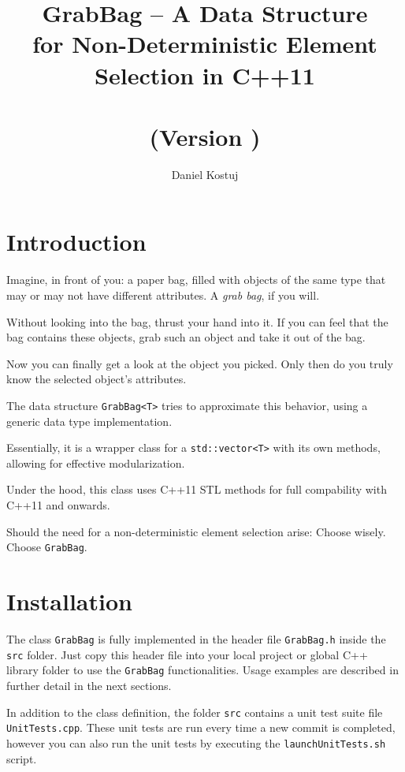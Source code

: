 \documentclass[a4paper,12pt]{article}
\title{GrabBag -- A Data Structure \\ for Non-Deterministic Element Selection in C++11 \\~\\ \normalsize(Version \packageversion)}
\author{Daniel Kostuj}
\begin{document}
\begin{titlingpage}
\maketitle 
\end{titlingpage}

\newpage

\section{Introduction}

Imagine, in front of you: a paper bag, filled with objects of the same type that may or may not have different attributes. 
A \emph{grab bag}, if you will. 

Without looking into the bag, thrust your hand into it.
If you can feel that the bag contains these objects, grab such an object and take it out of the bag.

Now you can finally get a look at the object you picked.
Only then do you truly know the selected object's attributes.

The data structure \texttt{GrabBag<T>} tries to approximate this behavior, using a generic data type implementation.

Essentially, it is a wrapper class for a \texttt{std::vector<T>} with its own methods, allowing for effective modularization.

Under the hood, this class uses C++11 STL methods for full compability with C++11 and onwards.

Should the need for a non-deterministic element selection arise: Choose wisely. Choose \texttt{GrabBag}.

\section{Installation}

The class \texttt{GrabBag} is fully implemented in the header file \texttt{GrabBag.h} inside the \texttt{src} folder. 
Just copy this header file into your local project or global C++ library folder to use the \texttt{GrabBag} functionalities. 
Usage examples are described in further detail in the next sections.

In addition to the class definition, the folder \texttt{src} contains a unit test suite file \texttt{UnitTests.cpp}. 
These unit tests are run every time a new commit is completed, however you can also run the unit tests by executing the \texttt{launchUnitTests.sh} script. 
\end{document}
